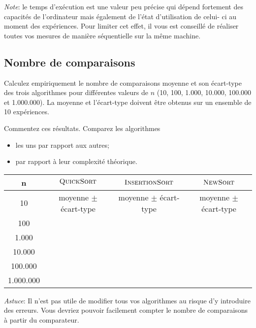 \documentclass[a4paper,10pt]{article}
\begin{document}
{\em Note}: le temps d'exécution est une valeur peu précise qui dépend fortement
des capacités de l'ordinateur mais également de l'état d'utilisation de celui-
ci au moment des expériences. Pour limiter cet effet, il vous est conseillé
de réaliser toutes vos mesures de manière séquentielle sur la même machine.

\subsection{Nombre de comparaisons}

Calculez empiriquement le nombre de comparaisons moyenne et son écart-type des
trois algorithmes pour différentes valeurs de $n$ (10, 100, 1.000, 10.000,
100.000 et 1.000.000). La moyenne et l'écart-type doivent être obtenus sur un
ensemble de 10 expériences.

Commentez ces résultats. Comparez les algorithmes
\begin{itemize}
\item les uns par rapport aux autres;
\item par rapport à leur complexité théorique.
\end{itemize}

\begin{center}
\begin{tabular}{cccc}
	\hline
	n & $\textnormal{\scshape QuickSort}$ & $\textnormal{\scshape InsertionSort}$ & $\textnormal{\scshape NewSort}$ \\
	\hline
	10 & moyenne $\pm$ écart-type & moyenne $\pm$ écart-type & moyenne $\pm$ écart-type\\
	100 & & &\\
	1.000 & & &\\
	10.000 & & &\\
	100.000 & & &\\
	1.000.000 & & &\\
\end{tabular}
\end{center}

{\em Astuce}: Il n'est pas utile de modifier tous vos algorithmes au risque d'y
introduire des erreurs. Vous devriez pouvoir facilement compter le nombre de
comparaisons à partir du comparateur.


\end{document}
